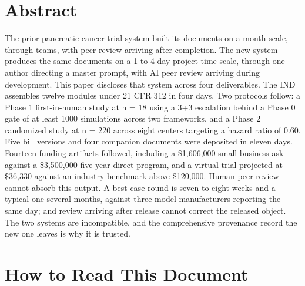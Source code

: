 \section*{Abstract}

The prior pancreatic cancer trial system built its documents on a month
scale, through teams, with peer review arriving after completion. The new
system produces the same documents on a 1 to 4 day project time scale, through
one author directing a master prompt, with AI peer review arriving during
development. This paper discloses that system across four deliverables. The IND
assembles twelve modules under 21 CFR 312 in four days. Two protocols follow: a
Phase 1 first-in-human study at n = 18 using a 3+3 escalation behind a Phase 0
gate of at least 1000 simulations across two frameworks, and a Phase 2
randomized study at n = 220 across eight centers targeting a hazard ratio of
0.60. Five bill versions and four companion documents were deposited in eleven
days. Fourteen funding artifacts followed, including a \$1,606,000
small-business ask against a \$3,500,000 five-year direct program, and a virtual
trial projected at \$36,330 against an industry benchmark above \$120,000.
Human peer review cannot absorb this output. A best-case round is seven to eight
weeks and a typical one several months, against three model manufacturers
reporting the same day; and review arriving after release cannot correct the
released object. The two systems are incompatible, and the comprehensive
provenance record the new one leaves is why it is trusted.

\section*{How to Read This Document}

